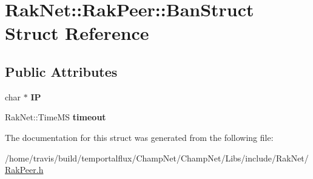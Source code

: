 \hypertarget{struct_rak_net_1_1_rak_peer_1_1_ban_struct}{\section{Rak\-Net\-:\-:Rak\-Peer\-:\-:Ban\-Struct Struct Reference}
\label{struct_rak_net_1_1_rak_peer_1_1_ban_struct}
}
\subsection*{Public Attributes}
\begin{DoxyCompactItemize}
\item 
\hypertarget{struct_rak_net_1_1_rak_peer_1_1_ban_struct_a7f3c6ee4dc4087e73212ff89d592d2fa}{char $\ast$ {\bfseries I\-P}}\label{struct_rak_net_1_1_rak_peer_1_1_ban_struct_a7f3c6ee4dc4087e73212ff89d592d2fa}

\item 
\hypertarget{struct_rak_net_1_1_rak_peer_1_1_ban_struct_a01e80cd646912f1b682565feef4202f6}{Rak\-Net\-::\-Time\-M\-S {\bfseries timeout}}\label{struct_rak_net_1_1_rak_peer_1_1_ban_struct_a01e80cd646912f1b682565feef4202f6}

\end{DoxyCompactItemize}


The documentation for this struct was generated from the following file\-:\begin{DoxyCompactItemize}
\item 
/home/travis/build/temportalflux/\-Champ\-Net/\-Champ\-Net/\-Libs/include/\-Rak\-Net/\hyperlink{_rak_peer_8h}{Rak\-Peer.\-h}\end{DoxyCompactItemize}
